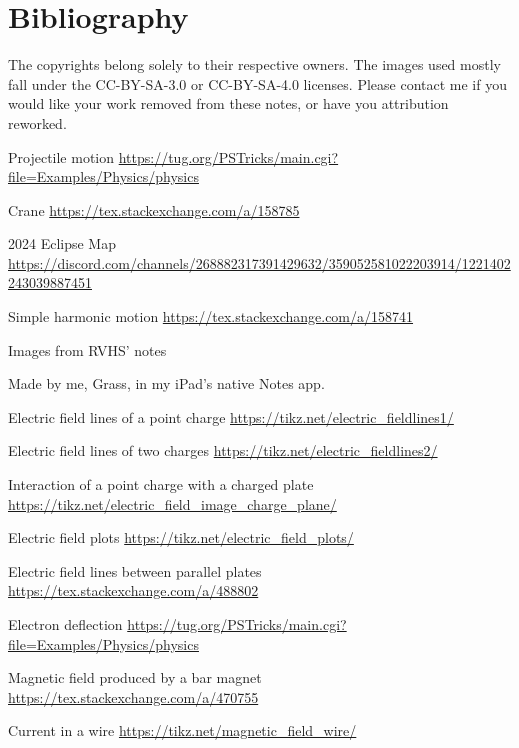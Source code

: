 \documentclass[oneside]{book}
\begin{document}
\chapter{Bibliography}
The copyrights belong solely to their respective owners. The images used mostly fall under the CC-BY-SA-3.0 or CC-BY-SA-4.0 licenses. Please contact me if you would like your work removed from these notes, or have you attribution reworked. 
\begin{enumerate}[label={[\arabic*]}]
    \item\label{Projectile motion} Projectile motion \url{https://tug.org/PSTricks/main.cgi?file=Examples/Physics/physics}
    \item\label{Crane} Crane \url{https://tex.stackexchange.com/a/158785}
    \item\label{2024 Eclipse Map} 2024 Eclipse Map \url{https://discord.com/channels/268882317391429632/359052581022203914/1221402243039887451}
    \item\label{Simple harmonic motion} Simple harmonic motion \url{https://tex.stackexchange.com/a/158741}
    \item\label{RVHS} Images from RVHS' notes
    \item\label{Me} Made by me, Grass, in my iPad's native Notes app.
    \item\label{Electric field lines of a point charge} Electric field lines of a point charge \url{https://tikz.net/electric_fieldlines1/}
    \item\label{Electric field lines of two charges} Electric field lines of two charges \url{https://tikz.net/electric_fieldlines2/}
    \item\label{Interaction of a point charge with a charged plate} Interaction of a point charge with a charged plate \url{https://tikz.net/electric_field_image_charge_plane/}
    \item\label{Electric field plots} Electric field plots \url{https://tikz.net/electric_field_plots/}
    \item\label{Electric field lines between parallel plates} Electric field lines between parallel plates \url{https://tex.stackexchange.com/a/488802}
    \item\label{Electron deflection} Electron deflection \url{https://tug.org/PSTricks/main.cgi?file=Examples/Physics/physics}
    \item\label{Magnetic field produced by a bar magnet} Magnetic field produced by a bar magnet \url{https://tex.stackexchange.com/a/470755} 
    \item\label{Current in a wire} Current in a wire \url{https://tikz.net/magnetic_field_wire/}

\end{enumerate}
\end{document}
